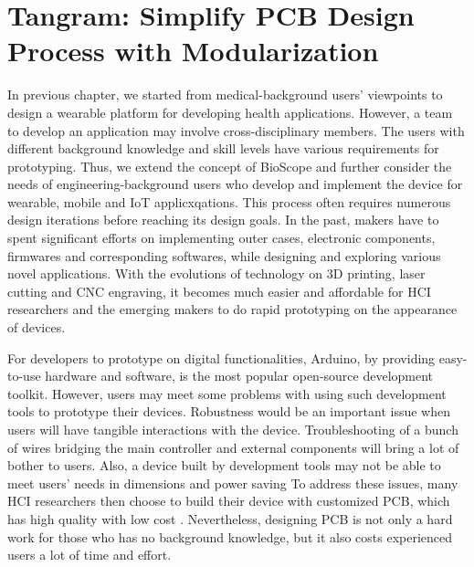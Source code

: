 \chapter{Tangram: Simplify PCB Design Process with Modularization}

In previous chapter, we started from medical-background users' viewpoints to design a wearable platform for developing health applications.
However, a team to develop an application may involve cross-disciplinary members.
The users with different background knowledge and skill levels have various requirements for prototyping.
Thus, we extend the concept of BioScope and further consider the needs of engineering-background users who develop and implement the device for wearable, mobile and IoT applicxqations.
This process often requires numerous design iterations before reaching its design goals.
In the past, makers have to spent significant efforts on implementing outer cases, electronic components, firmwares and corresponding softwares, while designing and exploring various novel applications.
With the evolutions of technology on 3D printing, laser cutting and CNC engraving, it becomes much easier and affordable for HCI researchers and the emerging makers \cite{maker_fair} to do rapid prototyping on the appearance of devices. 

For developers to prototype on digital functionalities, Arduino, by providing easy-to-use hardware and software, is the most popular open-source development toolkit.
However, users may meet some problems with using such development tools to prototype their devices.
Robustness would be an important issue when users will have tangible interactions with the device.
Troubleshooting of a bunch of wires bridging the main controller and external components will bring a lot of bother to users.
Also, a device built by development tools may not be able to meet users' needs in dimensions and power saving
To address these issues, many HCI researchers then choose to build their device with customized PCB, which has high quality with low cost \cite{seeed_fusion, smart_prototyping}. Nevertheless, designing PCB is not only a hard work for those who has no background knowledge, but it also costs experienced users a lot of time and effort.

